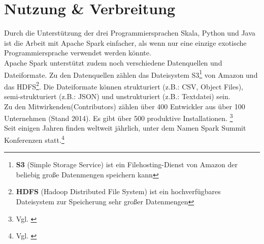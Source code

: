 \newpage
\section{Nutzung \& Verbreitung}
Durch die Unterstützung der drei Programmiersprachen Skala, Python und Java ist die Arbeit mit Apache Spark einfacher, als wenn nur eine einzige exotische Programmiersprache verwendet werden könnte. \\



\noindent
Apache Spark unterstützt zudem noch verschiedene Datenquellen und Dateiformate.  Zu den Datenquellen zählen das Dateisystem S3\footnote{\textbf{S3} (Simple Storage Service) ist ein Filehosting-Dienst von Amazon der beliebig große Datenmengen speichern kann} von Amazon und das HDFS\footnote{\textbf{HDFS} (Hadoop Distributed File System) ist ein hochverfügbares Dateisystem zur Speicherung sehr großer Datenmengen}.
Die Dateiformate können strukturiert (z.B.: CSV, Object Files), semi-strukturiert (z.B.: JSON) und unstrukturiert (z.B.: Textdatei) sein.\\

\noindent
Zu den Mitwirkenden(Contributors) zählen über 400 Entwickler aus über 100 Unternehmen (Stand 2014). Es gibt über 500 produktive Installationen. \footnote{Vgl. \cite{ADD+15}} \\ %

\noindent
Seit einigen Jahren finden weltweit jährlich, unter dem Namen \glqq{}Spark Summit\grqq{} Konferenzen statt.\footnote{Vgl. \cite{SPCOM}}\\



